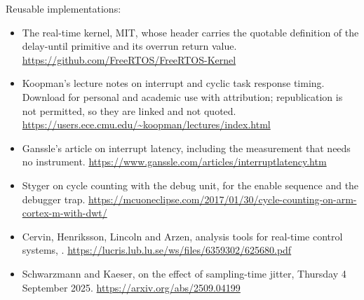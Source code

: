 Reusable implementations:
\begin{itemize}
\item The real-time kernel, MIT, whose header carries the quotable definition of
the delay-until primitive and its overrun return value.\newline
\url{https://github.com/FreeRTOS/FreeRTOS-Kernel}
\item Koopman's lecture notes on interrupt and cyclic task response timing.
Download for personal and academic use with attribution; republication is not
permitted, so they are linked and not quoted.\newline
\url{https://users.ece.cmu.edu/~koopman/lectures/index.html}
\item Ganssle's article on interrupt latency, including the measurement that
needs no instrument.\newline
\url{https://www.ganssle.com/articles/interruptlatency.htm}
\item Styger on cycle counting with the debug unit, for the enable sequence and
the debugger trap.\newline
\url{https://mcuoneclipse.com/2017/01/30/cycle-counting-on-arm-cortex-m-with-dwt/}
\item Cervin, Henriksson, Lincoln and Arzen, analysis tools for real-time
control systems, .\newline
\url{https://lucris.lub.lu.se/ws/files/6359302/625680.pdf}
\item Schwarzmann and Kaeser, on the effect of sampling-time jitter, Thursday 4
September 2025.\newline
\url{https://arxiv.org/abs/2509.04199}
\end{itemize}
